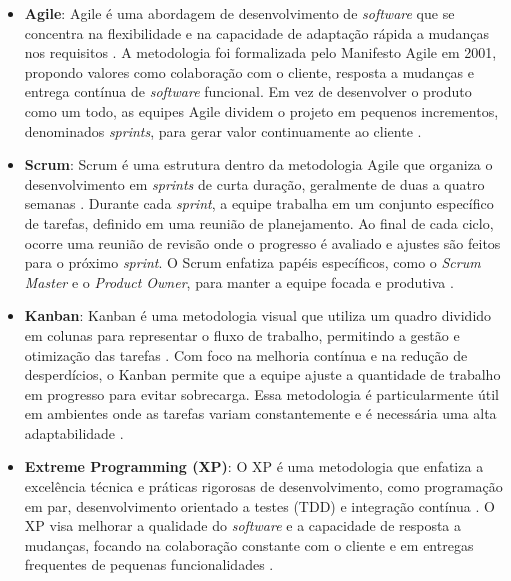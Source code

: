 \begin{itemize} \item \textbf{Agile}: Agile é uma abordagem de desenvolvimento de \textit{software} que se concentra na flexibilidade e na capacidade de adaptação rápida a mudanças nos requisitos \cite{agilemanif}. A metodologia foi formalizada pelo Manifesto Agile em 2001, propondo valores como colaboração com o cliente, resposta a mudanças e entrega contínua de \textit{software} funcional. Em vez de desenvolver o produto como um todo, as equipes Agile dividem o projeto em pequenos incrementos, denominados \textit{sprints}, para gerar valor continuamente ao cliente \cite{agilepractices}.

    \item \textbf{Scrum}: Scrum é uma estrutura dentro da metodologia Agile que organiza o desenvolvimento em \textit{sprints} de curta duração, geralmente de duas a quatro semanas \cite{scrumguide}. Durante cada \textit{sprint}, a equipe trabalha em um conjunto específico de tarefas, definido em uma reunião de planejamento. Ao final de cada ciclo, ocorre uma reunião de revisão onde o progresso é avaliado e ajustes são feitos para o próximo \textit{sprint}. O Scrum enfatiza papéis específicos, como o \textit{Scrum Master} e o \textit{Product Owner}, para manter a equipe focada e produtiva \cite{scrumroles}.

	\item \textbf{Kanban}: Kanban é uma metodologia visual que utiliza um quadro dividido em colunas para representar o fluxo de trabalho, permitindo a gestão e otimização das tarefas \cite{kanbanmethod}. Com foco na melhoria contínua e na redução de desperdícios, o Kanban permite que a equipe ajuste a quantidade de trabalho em progresso para evitar sobrecarga. Essa metodologia é particularmente útil em ambientes onde as tarefas variam constantemente e é necessária uma alta adaptabilidade \cite{kanbanflow}.

	\item \textbf{Extreme Programming (XP)}: O XP é uma metodologia que enfatiza a excelência técnica e práticas rigorosas de desenvolvimento, como programação em par, desenvolvimento orientado a testes (TDD) e integração contínua \cite{extremeprogramming}. O XP visa melhorar a qualidade do \textit{software} e a capacidade de resposta a mudanças, focando na colaboração constante com o cliente e em entregas frequentes de pequenas funcionalidades \cite{tddxp}.

\end{itemize}

